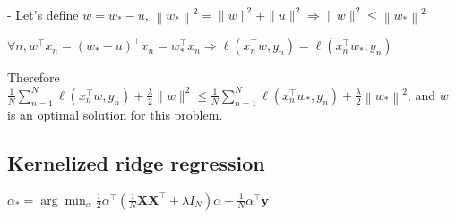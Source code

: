 - Let's define $w=w_{*}-u$,
$\left\|w_{*}\right\|^{2}=\|w\|^{2}+\|u\|^{2}\Rightarrow \|w\|^{2} \leq\left\|w_{*}\right\|^{2}$

$\forall n, w^{\top}x_{n}=\left(w_{*}-u\right)^{\top} x_{n}=w_{*}^{\top} x_{n}\Rightarrow\ell\left(x_{n}^{\top} w, y_{n}\right)=\ell\left(x_{n}^{\top} w_{*}, y_{n}\right)$

Therefore
$
\frac{1}{N} \sum_{n=1}^{N} \ell\left(x_{n}^{\top} w, y_{n}\right)+\frac{\lambda}{2}\|w\|^{2} \leq \frac{1}{N} \sum_{n=1}^{N} \ell\left(x_{n}^{\top} w_{*}, y_{n}\right)+\frac{\lambda}{2}\left\|w_{*}\right\|^{2}
$, and $w$ is an optimal solution for this problem.

\subsection*{Kernelized ridge regression}


$
\alpha_{*}=\arg \min _{\alpha} \frac{1}{2} \alpha^{\top}\left(\frac{1}{N} \mathbf{X} \mathbf{X}^{\top}+\lambda I_{N}\right) \alpha-\frac{1}{N} \alpha^{\top} \mathbf{y}
$






